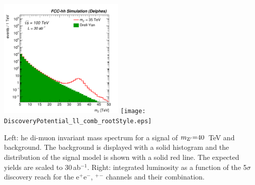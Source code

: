 \documentclass[11pt,twoside,a4paper]{cernrep}
\begin{document}
%
%
%
\begin{Figure}
  \centering
  \includegraphics[width= 0.45\textwidth]{mzp_sel0_stack_log.pdf}
  \texttt{[image: DiscoveryPotential\_ll\_comb\_rootStyle.eps]}
  \caption{Left: he di-muon invariant mass spectrum for a signal of $m_{\rm Z^{\prime}} {=} 40$~TeV and background. The background is displayed with a solid histogram and the distribution of the signal model is shown with a solid red line. The expected yields are scaled to 30\,ab$^{-1}$. Right: integrated luminosity as a function of the 5$\sigma$ discovery reach for the e$^+$e$^-$, \textmu$^+$\textmu$^-$ channels and their combination.}
  \label{fig:zprime}
\end{Figure}
\end{document}

